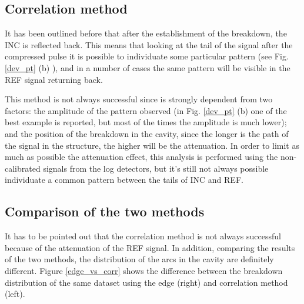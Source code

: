 \subsection[Correlation method]{Correlation method}

It has been outlined before that after the establishment of the breakdown, the INC is reflected back. This means that looking at the tail of the signal after the compressed pulse it is possible to individuate some particular pattern (see Fig. \ref{dev_pt} (b) ), and in a number of cases the same pattern will be visible in the REF signal returning back. 

This method is not always successful since is strongly dependent from two factors: the amplitude of the pattern observed (in Fig. \ref{dev_pt} (b) one of the best example is reported, but most of the times the amplitude is much lower); and the position of the breakdown in the cavity, since the longer is the path of the signal in the structure, the higher will be the attenuation. In order to limit as much as possible the attenuation effect, this analysis is performed using the non-calibrated signals from the log detectors, but it's still not always possible individuate a common pattern between the tails of INC and REF.


\subsection[Comparison of the two methods]{Comparison of the two methods}

It has to be pointed out that the correlation method is not always successful because of the attenuation of the REF signal. In addition, comparing the results of the two methods, the distribution of the arcs in the cavity are definitely different. Figure \ref{edge_vs_corr} shows the difference between the breakdown distribution of the same dataset using the edge (right) and correlation method (left). 

